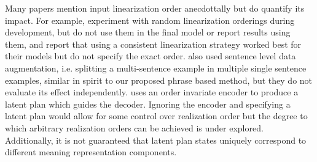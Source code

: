 %


Many papers mention input linearization order anecdottally but do quantify its
impact. For example, \citet{juraska2018} experiment with random
linearization orderings during development, but do not use them in the final
model or report results using them, and \citet{gehrmann2018} report that
using a consistent linearization strategy worked best for their models but do
not specify the exact order.  \citet{juraska2018} also used sentence
level data augmentation, i.e. splitting a multi-sentence example in multiple
single sentence examples, similar in spirit to our proposed phrase based
method, but they do not evaluate its effect independently.
\citet{wiseman2018} uses an order invariate encoder to produce a latent
plan which guides the decoder. Ignoring the encoder and specifying 
a latent plan would allow for some control over realization order but 
the degree to which arbitrary realization orders can be achieved is
under explored. Additionally, it is not guaranteed that latent plan
states uniquely correspond to different meaning representation components.




%


